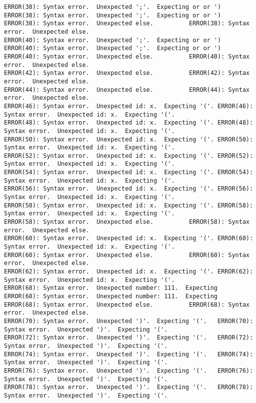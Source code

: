 \documentclass[12pt]{book}
\begin{document}
\begin{lstlisting}
ERROR(38): Syntax error.  Unexpected ';'.  Expecting or or ')	ERROR(38): Syntax error.  Unexpected ';'.  Expecting or or ')
ERROR(38): Syntax error.  Unexpected else.			ERROR(38): Syntax error.  Unexpected else.
ERROR(40): Syntax error.  Unexpected ';'.  Expecting or or ')	ERROR(40): Syntax error.  Unexpected ';'.  Expecting or or ')
ERROR(40): Syntax error.  Unexpected else.			ERROR(40): Syntax error.  Unexpected else.
ERROR(42): Syntax error.  Unexpected else.			ERROR(42): Syntax error.  Unexpected else.
ERROR(44): Syntax error.  Unexpected else.			ERROR(44): Syntax error.  Unexpected else.
ERROR(46): Syntax error.  Unexpected id: x.  Expecting '('.	ERROR(46): Syntax error.  Unexpected id: x.  Expecting '('.
ERROR(48): Syntax error.  Unexpected id: x.  Expecting '('.	ERROR(48): Syntax error.  Unexpected id: x.  Expecting '('.
ERROR(50): Syntax error.  Unexpected id: x.  Expecting '('.	ERROR(50): Syntax error.  Unexpected id: x.  Expecting '('.
ERROR(52): Syntax error.  Unexpected id: x.  Expecting '('.	ERROR(52): Syntax error.  Unexpected id: x.  Expecting '('.
ERROR(54): Syntax error.  Unexpected id: x.  Expecting '('.	ERROR(54): Syntax error.  Unexpected id: x.  Expecting '('.
ERROR(56): Syntax error.  Unexpected id: x.  Expecting '('.	ERROR(56): Syntax error.  Unexpected id: x.  Expecting '('.
ERROR(58): Syntax error.  Unexpected id: x.  Expecting '('.	ERROR(58): Syntax error.  Unexpected id: x.  Expecting '('.
ERROR(58): Syntax error.  Unexpected else.			ERROR(58): Syntax error.  Unexpected else.
ERROR(60): Syntax error.  Unexpected id: x.  Expecting '('.	ERROR(60): Syntax error.  Unexpected id: x.  Expecting '('.
ERROR(60): Syntax error.  Unexpected else.			ERROR(60): Syntax error.  Unexpected else.
ERROR(62): Syntax error.  Unexpected id: x.  Expecting '('.	ERROR(62): Syntax error.  Unexpected id: x.  Expecting '('.
ERROR(68): Syntax error.  Unexpected number: 111.  Expecting 	ERROR(68): Syntax error.  Unexpected number: 111.  Expecting 
ERROR(68): Syntax error.  Unexpected else.			ERROR(68): Syntax error.  Unexpected else.
ERROR(70): Syntax error.  Unexpected ')'.  Expecting '('.	ERROR(70): Syntax error.  Unexpected ')'.  Expecting '('.
ERROR(72): Syntax error.  Unexpected ')'.  Expecting '('.	ERROR(72): Syntax error.  Unexpected ')'.  Expecting '('.
ERROR(74): Syntax error.  Unexpected ')'.  Expecting '('.	ERROR(74): Syntax error.  Unexpected ')'.  Expecting '('.
ERROR(76): Syntax error.  Unexpected ')'.  Expecting '('.	ERROR(76): Syntax error.  Unexpected ')'.  Expecting '('.
ERROR(78): Syntax error.  Unexpected ')'.  Expecting '('.	ERROR(78): Syntax error.  Unexpected ')'.  Expecting '('.

\end{lstlisting}
\end{document}
